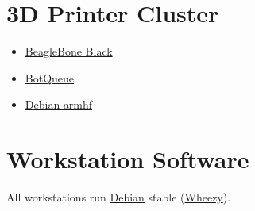 \section{3D Printer Cluster}
\begin{itemize}
\item \href{http://beagleboard.org/}{BeagleBone Black}
\item \href{http://botqueue.org/}{BotQueue}
\item \href{https://wiki.debian.org/ArmHardFloatPort}{Debian armhf}
\end{itemize}

\section{Workstation Software}

All workstations run \href{http://www.debian.org/}{Debian} stable (\href{https://www.debian.org/releases/wheezy/}{Wheezy}).

